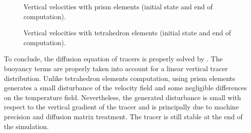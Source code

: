 \begin{figure}[!htbp]
\begin{minipage}[t]{0.50\textwidth}
 \centering
{}
\end{minipage}
\begin{minipage}[t]{0.50\textwidth}
 \centering
{}
\end{minipage}
 \caption{Vertical velocities with prism elements (initial state and end of computation).}
 \label{t3d:V:fig:prismVelo}
\end{figure}

\begin{figure}[!htbp]
\begin{minipage}[t]{0.50\textwidth}
 \centering
{}
\end{minipage}
\begin{minipage}[t]{0.50\textwidth}
 \centering
{}
\end{minipage}
 \caption{Vertical velocities with tetrahedron elements (initial state and end of computation).}
 \label{t3d:V:fig:tetraVelo}
\end{figure}


\bigskip
To conclude, the diffusion equation of tracers is properly solved by .
The buoyancy terms are properly taken into account for a linear vertical tracer distribution.
Unlike tetrahedron elements computation, using prism elements generates a small disturbance
of the velocity field and some negligible differences on the temperature field. Nevertheless, 
the generated disturbance is small with respect to the vertical gradient of the tracer and is 
principally due to machine precision and diffusion matrix treatment. The tracer is still 
stable at the end of the simulation.

